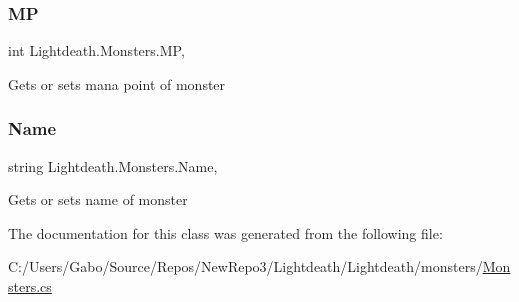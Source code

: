 \subsubsection{\texorpdfstring{MP}{MP}}
{\footnotesize\ttfamily int Lightdeath.\+Monsters.\+MP\hspace{0.3cm}{\ttfamily [get]}, {\ttfamily [set]}}



Gets or sets mana point of monster 

\hypertarget{class_lightdeath_1_1_monsters_a2503ac1a54faf2c40396a13fddcc44a4}{}\label{class_lightdeath_1_1_monsters_a2503ac1a54faf2c40396a13fddcc44a4} 
\subsubsection{\texorpdfstring{Name}{Name}}
{\footnotesize\ttfamily string Lightdeath.\+Monsters.\+Name\hspace{0.3cm}{\ttfamily [get]}, {\ttfamily [set]}}



Gets or sets name of monster 



The documentation for this class was generated from the following file\+:\begin{DoxyCompactItemize}
\item 
C\+:/\+Users/\+Gabo/\+Source/\+Repos/\+New\+Repo3/\+Lightdeath/\+Lightdeath/monsters/\hyperlink{_monsters_8cs}{Monsters.\+cs}\end{DoxyCompactItemize}

